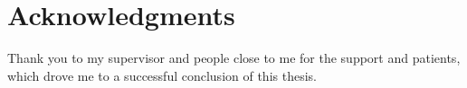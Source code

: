 \thispagestyle{empty}
\section*{Acknowledgments}

Thank you to my supervisor and people close to me for the support and patients, which drove me to a successful conclusion of this thesis.

\newpage
\thispagestyle{empty}
\mbox{}
\newpage